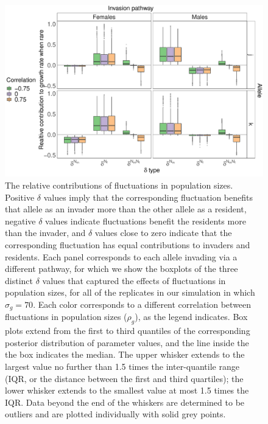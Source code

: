 \begin{figure}[H]
  \centerline{\includegraphics[width=1\textwidth]{box_plots.pdf}}
  \caption{The relative contributions of fluctuations in population sizes. Positive $\delta$ values imply that the corresponding fluctuation benefits that allele as an invader more than the other allele as a resident, negative $\delta$ values indicate fluctuations benefit the residents more than the invader, and $\delta$ values close to zero indicate that the corresponding fluctuation has equal contributions to invaders and residents. Each panel corresponds to each allele invading via a different pathway, for which we show the boxplots of the three distinct $\delta$ values that captured the effects of fluctuations in population sizes, for all of the replicates in our simulation in which $\sigma_{g}=70$. Each color corresponds to a different correlation between fluctuations in population sizes ($\rho_{g}$), as the legend indicates. Box plots extend from the first to third quantiles of the corresponding posterior distribution of parameter values, and the line inside the the box indicates the median. The upper whisker extends to the largest value no further than 1.5 times the inter-quantile range (IQR, or the distance between the first and third quartiles); the lower whisker extends to the smallest value at most 1.5 times the IQR. Data beyond the end of the whiskers are determined to be outliers and are plotted individually with solid grey points. }
    \label{fig:boxes}
\end{figure}




